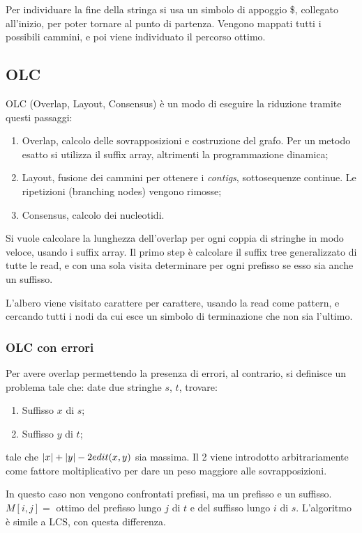 Per individuare la fine della stringa si usa un simbolo di appoggio \$, collegato all'inizio, per poter tornare al punto di partenza. Vengono mappati tutti i possibili cammini, e poi viene individuato il percorso ottimo.

\subsection{OLC}
OLC (Overlap, Layout, Consensus) è un modo di eseguire la riduzione tramite questi passaggi:
\begin{enumerate}
	\item Overlap, calcolo delle sovrapposizioni e costruzione del grafo. Per un metodo esatto si utilizza il suffix array, altrimenti la programmazione dinamica;
	\item Layout, fusione dei cammini per ottenere i \textit{contigs}, sottosequenze continue. Le ripetizioni (branching nodes) vengono rimosse;
	\item Consensus, calcolo dei nucleotidi.
\end{enumerate}

Si vuole calcolare la lunghezza dell'overlap per ogni coppia di stringhe in modo veloce, usando i suffix array. Il primo step è calcolare il suffix tree generalizzato di tutte le read, e con una sola visita determinare per ogni prefisso se esso sia anche un suffisso.

L'albero viene visitato carattere per carattere, usando la read come pattern, e cercando tutti i nodi da cui esce un simbolo di terminazione che non sia l'ultimo. 

\subsubsection{OLC con errori}
Per avere overlap permettendo la presenza di errori, al contrario, si definisce un problema tale che: date due stringhe $s$, $t$, trovare:
\begin{enumerate}
	\item Suffisso $x$ di $s$;
	\item Suffisso $y$ di $t$;
\end{enumerate}
tale che $\left|x\right| + \left|y\right| - 2edit(x, y)$ sia massima. Il 2 viene introdotto arbitrariamente come fattore moltiplicativo per dare un peso maggiore alle sovrapposizioni.

In questo caso non vengono confrontati prefissi, ma un prefisso e un suffisso. $M[i, j] =$ ottimo del prefisso lungo $j$ di $t$ e del suffisso lungo $i$ di $s$. L'algoritmo è simile a LCS, con questa differenza. 

